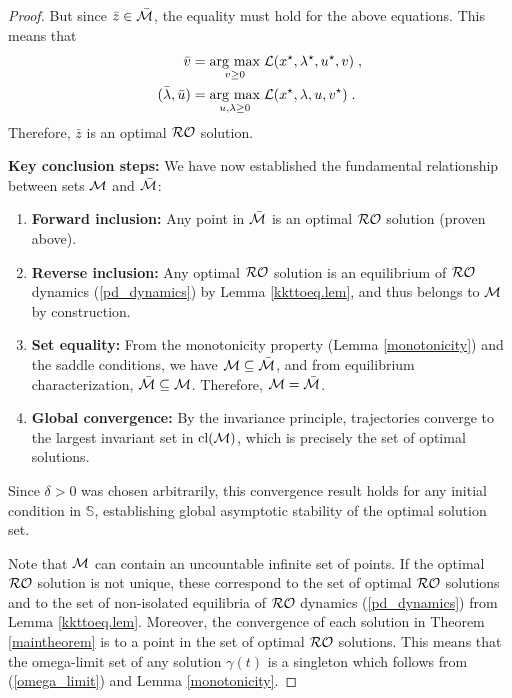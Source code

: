 \documentclass[journal,twoside,web]{ieeecolor}
\newcommand{\rev}[1]{\textcolor{revisionblue}{#1}}
\newcommand{\argmax}[1]{\underset{#1}{\operatorname{arg}\,\operatorname{max}}\;}
\begin{document}
\begin{proof}
But since $\bar{z}\in \bar{\cal M}$, the equality must hold for the above equations. This means that
\begin{align*}
\bar{v}&=\argmax{v \geq 0} {\cal L}(x^\star,\lambda^\star,u^\star,v)\;,\\
(\bar{\lambda},\bar{u})&=\argmax{u,\lambda \geq 0} {\cal L}(x^\star,\lambda,u,v^\star)\;.
\end{align*}
Therefore, ${\bar{z}}$ is an optimal ${\cal RO}$ solution. 

\rev{\textbf{Key conclusion steps:} We have now established the fundamental relationship between sets ${\cal M}$ and $\bar{\cal M}$:
\begin{enumerate}
\item \textbf{Forward inclusion:} Any point in $\bar{\cal M}$ is an optimal ${\cal RO}$ solution (proven above).
\item \textbf{Reverse inclusion:} Any optimal ${\cal RO}$ solution is an equilibrium of ${\cal RO}$ dynamics (\ref{pd_dynamics}) by Lemma \ref{kkttoeq.lem}, and thus belongs to ${\cal M}$ by construction.
\item \textbf{Set equality:} From the monotonicity property (Lemma \ref{monotonicity}) and the saddle conditions, we have ${\cal M} \subseteq \bar{\cal M}$, and from equilibrium characterization, $\bar{\cal M} \subseteq {\cal M}$. Therefore, ${\cal M} = \bar{\cal M}$.
\item \textbf{Global convergence:} By the invariance principle, trajectories converge to the largest invariant set in $\text{cl}({\cal M})$, which is precisely the set of optimal solutions.
\end{enumerate}

Since $\delta > 0$ was chosen arbitrarily, this convergence result holds for any initial condition in $\mathbb S$, establishing global asymptotic stability of the optimal solution set.}

Note that ${\cal M}$ can contain an uncountable infinite set of points. If the optimal ${\cal RO}$ solution is not unique, these correspond to the set of optimal ${\cal RO}$ solutions and to the set of non-isolated equilibria of ${\cal RO}$ dynamics (\ref{pd_dynamics}) from Lemma \ref{kkttoeq.lem}. Moreover, the convergence of each solution in Theorem \ref{maintheorem} is to a point in the set of optimal ${\cal RO}$ solutions. This means that the omega-limit set of any solution $\gamma(t)$ is a singleton which follows from (\ref{omega_limit}) and Lemma \ref{monotonicity}.
\end{proof}
\end{document}
